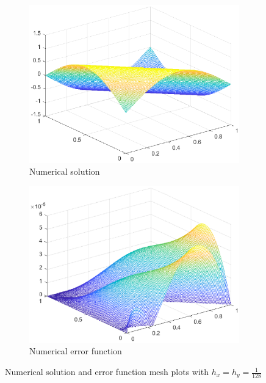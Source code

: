 \documentclass{homework}
\begin{document}
\begin{alphaparts}
		\begin{figure}[h]
			\begin{subfigure}{.45\textwidth}
				\centering
				\includegraphics[width=\textwidth]{p3c_u.eps}
				\caption{Numerical solution}
			\end{subfigure}
			\hfill
			\begin{subfigure}{.45\textwidth}
				\centering
				\includegraphics[width=\textwidth]{p3c_error.eps}
				\caption{Numerical error function}
			\end{subfigure}
			\caption{Numerical solution and error function mesh plots with $h_x = h_y=\frac{1}{128}$}
			\label{fig:p3c}
		\end{figure}
		

\end{alphaparts}
\end{document}
